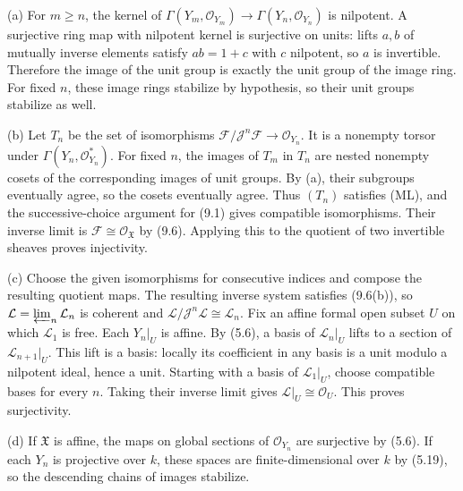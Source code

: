 (a) For $m\ge n$, the kernel of $\Gamma(Y_m,\mathcal O_{Y_m})\to\Gamma(Y_n,\mathcal O_{Y_n})$ is nilpotent. A surjective ring map with nilpotent kernel is surjective on units: lifts $a,b$ of mutually inverse elements satisfy $ab=1+c$ with $c$ nilpotent, so $a$ is invertible. Therefore the image of the unit group is exactly the unit group of the image ring. For fixed $n$, these image rings stabilize by hypothesis, so their unit groups stabilize as well.

(b) Let $T_n$ be the set of isomorphisms $\mathcal F/\mathcal J^n\mathcal F\to\mathcal O_{Y_n}$. It is a nonempty torsor under $\Gamma(Y_n,\mathcal O_{Y_n}^*)$. For fixed $n$, the images of $T_m$ in $T_n$ are nested nonempty cosets of the corresponding images of unit groups. By (a), their subgroups eventually agree, so the cosets eventually agree. Thus $(T_n)$ satisfies (ML), and the successive-choice argument for (9.1) gives compatible isomorphisms. Their inverse limit is $\mathcal F\cong\mathcal O_{\mathfrak X}$ by (9.6). Applying this to the quotient of two invertible sheaves proves injectivity.

(c) Choose the given isomorphisms for consecutive indices and compose the resulting quotient maps. The resulting inverse system satisfies (9.6(b)), so $\mathcal L=\varprojlim_n\mathcal L_n$ is coherent and $\mathcal L/\mathcal J^n\mathcal L\cong\mathcal L_n$. Fix an affine formal open subset $U$ on which $\mathcal L_1$ is free. Each $Y_n|_U$ is affine. By (5.6), a basis of $\mathcal L_n|_U$ lifts to a section of $\mathcal L_{n+1}|_U$. This lift is a basis: locally its coefficient in any basis is a unit modulo a nilpotent ideal, hence a unit. Starting with a basis of $\mathcal L_1|_U$, choose compatible bases for every $n$. Taking their inverse limit gives $\mathcal L|_U\cong\mathcal O_U$. This proves surjectivity.

(d) If $\mathfrak X$ is affine, the maps on global sections of $\mathcal O_{Y_n}$ are surjective by (5.6). If each $Y_n$ is projective over $k$, these spaces are finite-dimensional over $k$ by (5.19), so the descending chains of images stabilize.
